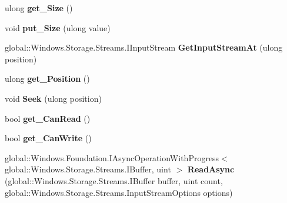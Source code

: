 \begin{DoxyCompactItemize}
ulong {\bfseries get\+\_\+\+Size} ()
\item 
\mbox{\label{class_windows_1_1_storage_1_1_streams_1_1_in_memory_random_access_stream_ac8b380272b33f6167715e900ce8b155f}} 
void {\bfseries put\+\_\+\+Size} (ulong value)
\item 
\mbox{\label{class_windows_1_1_storage_1_1_streams_1_1_in_memory_random_access_stream_a4eb2c7faf4803409163b311c912a083b}} 
global\+::\+Windows.\+Storage.\+Streams.\+I\+Input\+Stream {\bfseries Get\+Input\+Stream\+At} (ulong position)
\item 
\mbox{\label{class_windows_1_1_storage_1_1_streams_1_1_in_memory_random_access_stream_a60db0cabd4922fd35bbb2d64a7b381f1}} 
ulong {\bfseries get\+\_\+\+Position} ()
\item 
\mbox{\label{class_windows_1_1_storage_1_1_streams_1_1_in_memory_random_access_stream_a9dca3616e54f1113bfe6b6705612182b}} 
void {\bfseries Seek} (ulong position)
\item 
\mbox{\label{class_windows_1_1_storage_1_1_streams_1_1_in_memory_random_access_stream_aa39fd9f2f1b3be1d9282cff918d74651}} 
bool {\bfseries get\+\_\+\+Can\+Read} ()
\item 
\mbox{\label{class_windows_1_1_storage_1_1_streams_1_1_in_memory_random_access_stream_a6130af7a8779a5e32ddb40559aed883d}} 
bool {\bfseries get\+\_\+\+Can\+Write} ()
\item 
\mbox{\label{class_windows_1_1_storage_1_1_streams_1_1_in_memory_random_access_stream_add150174cbde0a2405293e8765f70bd3}} 
global\+::\+Windows.\+Foundation.\+I\+Async\+Operation\+With\+Progress$<$ global\+::\+Windows.\+Storage.\+Streams.\+I\+Buffer, uint $>$ {\bfseries Read\+Async} (global\+::\+Windows.\+Storage.\+Streams.\+I\+Buffer buffer, uint count, global\+::\+Windows.\+Storage.\+Streams.\+Input\+Stream\+Options options)

\end{DoxyCompactItemize}
